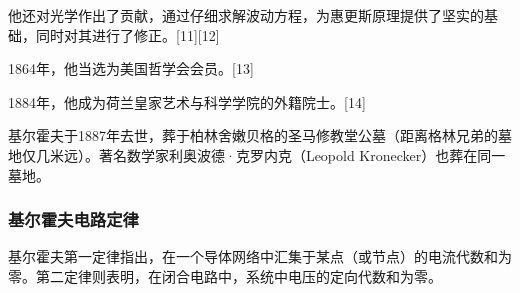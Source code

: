他还对光学作出了贡献，通过仔细求解波动方程，为惠更斯原理提供了坚实的基础，同时对其进行了修正。[11][12]

1864年，他当选为美国哲学会会员。[13] 

1884年，他成为荷兰皇家艺术与科学学院的外籍院士。[14]

基尔霍夫于1887年去世，葬于柏林舍嫩贝格的圣马修教堂公墓（距离格林兄弟的墓地仅几米远）。著名数学家利奥波德·克罗内克（Leopold Kronecker）也葬在同一墓地。
\subsubsection{基尔霍夫电路定律}  
基尔霍夫第一定律指出，在一个导体网络中汇集于某点（或节点）的电流代数和为零。第二定律则表明，在闭合电路中，系统中电压的定向代数和为零。